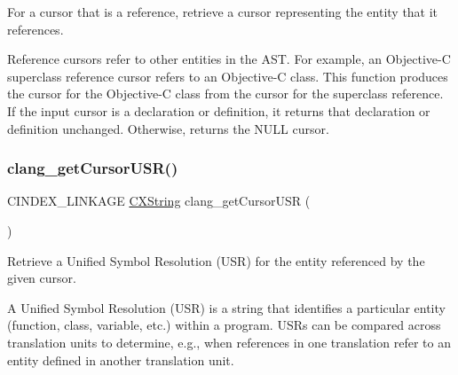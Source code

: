 For a cursor that is a reference, retrieve a cursor representing the entity that it references. 

Reference cursors refer to other entities in the A\+ST. For example, an Objective-\/C superclass reference cursor refers to an Objective-\/C class. This function produces the cursor for the Objective-\/C class from the cursor for the superclass reference. If the input cursor is a declaration or definition, it returns that declaration or definition unchanged. Otherwise, returns the N\+U\+LL cursor. \mbox{\label{group__CINDEX__CURSOR__XREF_ga51679cb755bbd94cc5e9476c685f2df3}} 
\subsubsection{\texorpdfstring{clang\+\_\+get\+Cursor\+U\+S\+R()}{clang\_getCursorUSR()}}
{\footnotesize\ttfamily C\+I\+N\+D\+E\+X\+\_\+\+L\+I\+N\+K\+A\+GE \hyperlink{structCXString}{C\+X\+String} clang\+\_\+get\+Cursor\+U\+SR (\begin{DoxyParamCaption}\item[{\hyperlink{structCXCursor}{C\+X\+Cursor}}]{ }\end{DoxyParamCaption})}



Retrieve a Unified Symbol Resolution (U\+SR) for the entity referenced by the given cursor. 

A Unified Symbol Resolution (U\+SR) is a string that identifies a particular entity (function, class, variable, etc.) within a program. U\+S\+Rs can be compared across translation units to determine, e.\+g., when references in one translation refer to an entity defined in another translation unit. 